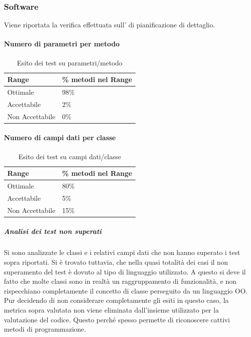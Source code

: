 \documentclass[12pt,a4paper]{article}
\begin{document}
	\subsubsection{Software}
	Viene riportata la verifica effettuata sull'  di pianificazione di dettaglio. 
	\paragraph{Numero di parametri per metodo}
	\begin{table}[H]
		\begin{center}
			\begin{tabular}{p{} p{}}
				\toprule
				\textbf{Range}   & \textbf{\% metodi nel Range}	 \\ \midrule
				\midrule
				Ottimale & 98\% \\ \midrule
				Accettabile & 2\%  \\ \midrule
				Non Accettabile  & 0\%  \\ \midrule
				\bottomrule
			\end{tabular}
		\end{center}
		\caption{Esito dei test su  parametri/metodo}
	\end{table}
	
	\paragraph{Numero di campi dati per classe}
	\begin{table}[H]
		\begin{center}
			\begin{tabular}{p{} p{} }
				\toprule
				\textbf{Range}   & \textbf{\% metodi nel Range}	\\ \midrule
				\midrule
				Ottimale & 80\% \\ \midrule
				Accettabile & 5\%  \\ \midrule
				Non Accettabile  & 15\%  \\ \midrule
				
			\end{tabular}
		\end{center}
		\caption{Esito dei test su campi dati/classe}
	\end{table}
	
	\subparagraph{Analisi dei test non superati} 
	Si sono analizzate le classi e i relativi campi dati che non hanno superato i test sopra riportati. Si è trovato tuttavia, che nella quasi totalità dei casi il non superamento del test è dovuto al tipo di linguaggio utilizzato. A questo si deve il fatto che molte classi sono in realtà un raggruppamento di funzionalità, e non rispecchiano completamente il concetto di classe perseguito da un linguaggio OO. Pur decidendo di non considerare completamente gli esiti in questo caso, la metrica sopra valutata non viene eliminata dall'insieme utilizzato per la valutazione del codice. 
	Questo perché spesso permette di riconoscere cattivi metodi di programmazione.
	
\end{document}
